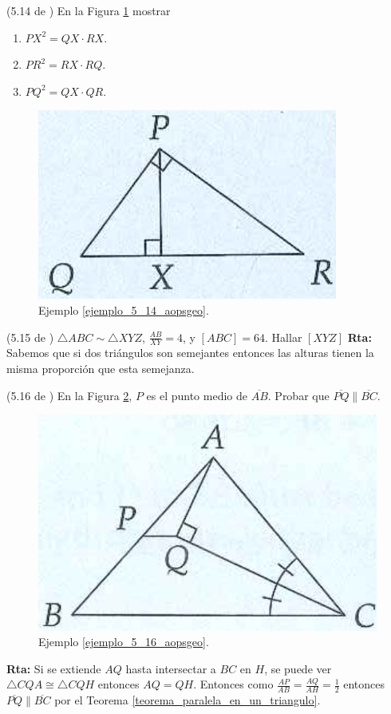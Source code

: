 \begin{ejemplo}{(5.14 de \cite{Aops_Geometria})}
	\label{ejemplo_5_14_aopsgeo}En la Figura \ref{5_14_aopsgeo} mostrar 
	\begin{enumerate}[label=\Alph*) ]
			\item ${PX}^2 = QX\cdot RX$.
			\item ${PR}^2 = RX\cdot RQ$.
			\item ${PQ}^2 = QX\cdot QR$.
	\end{enumerate}
	\begin{figure}[H]
		\centering
		\includegraphics[width=0.3\linewidth]{Geometria/imgs/5_14_aopsgeo}
		\caption{Ejemplo \ref{ejemplo_5_14_aopsgeo}.}
		\label{5_14_aopsgeo}
	\end{figure}
\end{ejemplo}

\begin{ejemplo}{(5.15 de \cite{Aops_Geometria})}
	\label{ejemplo_5_15_aopsgeo} $\triangle ABC \sim \triangle XYZ$, $\frac{AB}{XY}=4$, y $\left[ABC\right]=64$. Hallar $\left[XYZ\right]$
	\textbf{Rta:} Sabemos que si dos triángulos son semejantes entonces las alturas tienen la misma proporción que esta semejanza. 
\end{ejemplo}

\begin{ejemplo}{(5.16 de \cite{Aops_Geometria})}
	\label{ejemplo_5_16_aopsgeo}En la Figura \ref{5_16_aopsgeo}, $P$ es el punto medio de $\overline{AB}$. Probar que $\overline{PQ}\parallel \overline{BC}$.
	\begin{figure}[H]
		\centering
		\includegraphics[width=0.3\linewidth]{Geometria/imgs/5_16_aopsgeo}
		\caption{Ejemplo \ref{ejemplo_5_16_aopsgeo}.}
		\label{5_16_aopsgeo}
	\end{figure}
	\textbf{Rta: }Si se extiende $AQ$ hasta intersectar a $BC$ en $H$, se puede ver $\triangle CQA \cong \triangle CQH$ entonces $AQ=QH$. Entonces como $\frac{AP}{AB}=\frac{AQ}{AH}=\frac{1}{2}$ entonces $\overline{PQ}\parallel \overline{BC}$ por el Teorema \ref{teorema_paralela_en_un_triangulo}.
\end{ejemplo}

